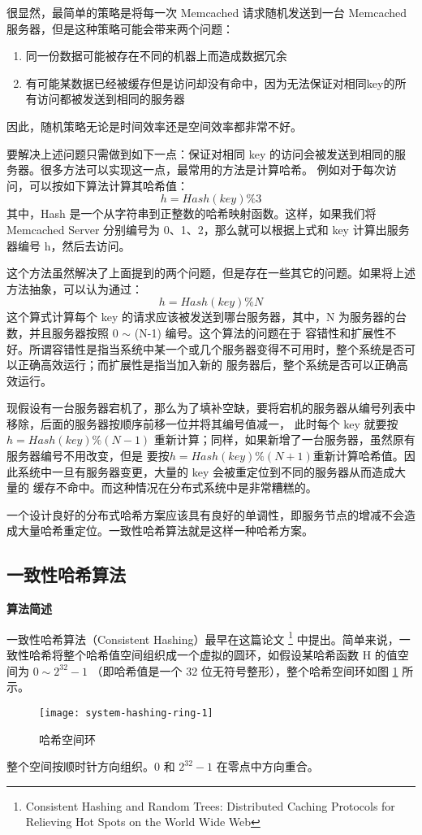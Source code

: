 很显然，最简单的策略是将每一次 Memcached 请求随机发送到一台 Memcached 服务器，但是这种策略可能会带来两个问题：
\begin{enumerate}
	\item 同一份数据可能被存在不同的机器上而造成数据冗余
	\item 有可能某数据已经被缓存但是访问却没有命中，因为无法保证对相同key的所有访问都被发送到相同的服务器
\end{enumerate}
因此，随机策略无论是时间效率还是空间效率都非常不好。

要解决上述问题只需做到如下一点：保证对相同 key 的访问会被发送到相同的服务器。很多方法可以实现这一点，最常用的方法是计算哈希。
例如对于每次访问，可以按如下算法计算其哈希值：
\begin{equation*}
h = Hash(key) \% 3
\end{equation*}
其中，Hash 是一个从字符串到正整数的哈希映射函数。这样，如果我们将 Memcached Server 分别编号为 0、1、2，那么就可以根据上式和
key 计算出服务器编号 h，然后去访问。

这个方法虽然解决了上面提到的两个问题，但是存在一些其它的问题。如果将上述方法抽象，可以认为通过：
\begin{equation*}
h = Hash(key) \% N
\end{equation*}
这个算式计算每个 key 的请求应该被发送到哪台服务器，其中，N 为服务器的台数，并且服务器按照 0 $\sim$ (N-1) 编号。这个算法的问题在于
容错性和扩展性不好。所谓容错性是指当系统中某一个或几个服务器变得不可用时，整个系统是否可以正确高效运行；而扩展性是指当加入新的
服务器后，整个系统是否可以正确高效运行。

现假设有一台服务器宕机了，那么为了填补空缺，要将宕机的服务器从编号列表中移除，后面的服务器按顺序前移一位并将其编号值减一，
此时每个 key 就要按 $h = Hash(key) \% (N-1)$ 重新计算；同样，如果新增了一台服务器，虽然原有服务器编号不用改变，但是
要按$h = Hash(key) \% (N+1)$重新计算哈希值。因此系统中一旦有服务器变更，大量的 key 会被重定位到不同的服务器从而造成大量的
缓存不命中。而这种情况在分布式系统中是非常糟糕的。

一个设计良好的分布式哈希方案应该具有良好的单调性，即服务节点的增减不会造成大量哈希重定位。一致性哈希算法就是这样一种哈希方案。


\subsection{一致性哈希算法}

\noindent\textbf{算法简述}

一致性哈希算法（Consistent Hashing）最早在这篇论文%
\footnote{Consistent Hashing and Random Trees: Distributed Caching Protocols for Relieving Hot Spots on the World Wide Web}%
中提出。简单来说，一致性哈希将整个哈希值空间组织成一个虚拟的圆环，如假设某哈希函数 H 的值空间为 $0 \sim 2^{32}-1$
（即哈希值是一个 32 位无符号整形），整个哈希空间环如图 \ref{fig:system-hashing-ring-1} 所示。
\begin{figure}[hbtp]
\centering
\texttt{[image: system-hashing-ring-1]}
\caption{哈希空间环}
\label{fig:system-hashing-ring-1}
\end{figure}
整个空间按顺时针方向组织。0 和 $2^{32}-1$ 在零点中方向重合。

